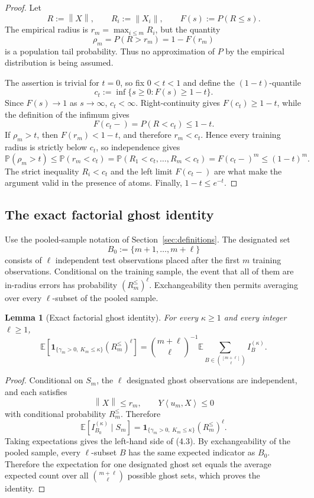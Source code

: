 \documentclass[11pt]{article}
\newtheorem{lemma}[theorem]{Lemma}
\theoremstyle{definition}
\theoremstyle{remark}
\newcommand{\E}{\mathbb E}
\newcommand{\Pp}{\mathbb P}
\newcommand{\one}{\mathbf 1}
\newcommand{\ip}[2]{\left\langle #1,#2\right\rangle}
\newcommand{\norm}[1]{\left\lVert #1\right\rVert}
\begin{document}
\begin{proof}
Let
\[
 R:=\norm X,
 \qquad
 R_i:=\norm{X_i},
 \qquad
 F(s):=P(R\le s).
\]
The empirical radius is \(r_m=\max_{i\le m}R_i\), but the quantity
\[
 \rho_m=P(R>r_m)=1-F(r_m)
\]
is a population tail probability. Thus no approximation of \(P\) by the
empirical distribution is being assumed.

The assertion is trivial for \(t=0\), so fix \(0<t<1\) and define the
\((1-t)\)-quantile
\[
 c_t:=\inf\{s\ge0:F(s)\ge1-t\}.
\]
Since \(F(s)\to1\) as \(s\to\infty\), \(c_t<\infty\). Right-continuity gives
\(F(c_t)\ge1-t\), while the definition of the infimum gives
\[
 F(c_t-)=P(R<c_t)\le1-t.
\]
If \(\rho_m>t\), then \(F(r_m)<1-t\), and therefore \(r_m<c_t\). Hence every
training radius is strictly below \(c_t\), so independence gives
\[
 \Pp(\rho_m>t)
 \le
 \Pp(r_m<c_t)
 =
 \Pp(R_1<c_t,\ldots,R_m<c_t)
 =
 F(c_t-)^m
 \le
 (1-t)^m.
\]
The strict inequality \(R_i<c_t\) and the left limit \(F(c_t-)\) are what
make the argument valid in the presence of atoms. Finally,
\(1-t\le e^{-t}\).
\end{proof}

\subsection{The exact factorial ghost identity}

Use the pooled-sample notation of Section~\ref{sec:definitions}. The
designated set
\[
 B_0:=\{m+1,\ldots,m+\ell\}
\]
consists of \(\ell\) independent test observations placed after the first
\(m\) training observations. Conditional on the training sample, the event
that all of them are in-radius errors has probability
\((R_m^{\le})^\ell\). Exchangeability then permits averaging over every
\(\ell\)-subset of the pooled sample.

\begin{lemma}[Exact factorial ghost identity]
\label{lem:ghost}
For every \(\kappa\ge1\) and every integer \(\ell\ge1\),
\[
 \boxed{
 \E\left[
   \one_{\{\gamma_m>0,\ K_m\le \kappa\}}
   (R_m^{\le})^\ell
 \right]
 =
 \binom{m+\ell}{\ell}^{-1}
 \E\sum_{B\in\binom{[m+\ell]}\ell}I_B^{(\kappa)}.}
 \tag{4.3}
\]
\end{lemma}

\begin{proof}
Conditional on \(S_m\), the \(\ell\) designated ghost
observations are independent, and each satisfies
\[
 \norm X\le r_m,
 \qquad
 Y\ip{u_m}{X}\le0
\]
with conditional probability \(R_m^{\le}\). Therefore
\[
 \E[I_{B_0}^{(\kappa)}\mid S_m]
 =
 \one_{\{\gamma_m>0,\ K_m\le \kappa\}}
 (R_m^{\le})^\ell.
\]
Taking expectations gives the left-hand side of (4.3). By exchangeability of
the pooled sample, every \(\ell\)-subset \(B\) has the same expected
indicator as \(B_0\). Therefore the expectation for one designated ghost
set equals the average expected count over all
\(\binom{m+\ell}{\ell}\) possible ghost sets, which proves the identity.
\end{proof}
\end{document}
